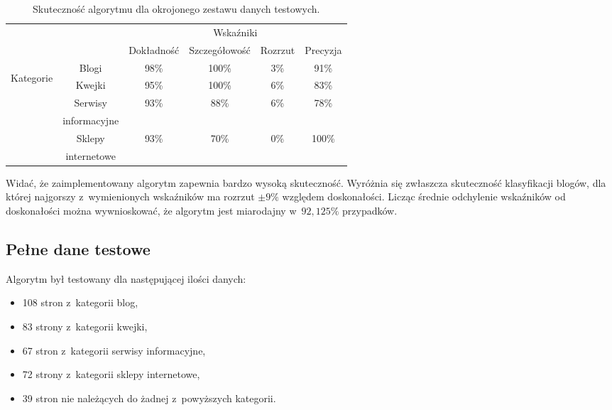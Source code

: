 \documentclass[a4paper,11pt]{article}
\begin{document}
\begin{table}[ht!]
\centering
    \begin{tabular}{| c | c | c | c | c | c |}
        \hline
        \multicolumn{2}{|c|}{} & \multicolumn{4}{c|}{Wskaźniki} \\
        \cline{3-6}
        \multicolumn{2}{|c|}{} & Dokładność & Szczegółowość & Rozrzut & Precyzja \\
        \hline
        \multirow{6}{*}{\begin{sideways}Kategorie \end{sideways}} & Blogi & 98\% & 100\% & 3\% & 91\% \\
        \cline{2-6}
        & Kwejki & 95\% & 100\% & 6\% & 83\% \\
        \cline{2-6}
        & Serwisy & \multirow{2}{*}{93\%} & \multirow{2}{*}{88\%} & \multirow{2}{*}{6\%} & \multirow{2}{*}{78\%} \\
        & informacyjne & & & & \\
        \cline{2-6}
        & Sklepy & \multirow{2}{*}{93\%} & \multirow{2}{*}{70\%} & \multirow{2}{*}{0\%} & \multirow{2}{*}{100\%} \\
        & internetowe & & & & \\
        \hline
    \end{tabular}
    \caption{Skuteczność algorytmu dla okrojonego zestawu danych testowych.}
    \label{tab:reduced_set_accuracy}
\end{table}

Widać, że zaimplementowany algorytm zapewnia bardzo wysoką skuteczność. Wyróżnia się zwłaszcza skuteczność klasyfikacji blogów, dla której najgorszy z~wymienionych wskaźników ma rozrzut $\pm 9\%$ względem doskonałości. Licząc średnie odchylenie wskaźników od doskonałości można wywnioskować, że  algorytm jest miarodajny w~$92,125\%$ przypadków.

\subsection{Pełne dane testowe}

Algorytm był testowany dla następującej ilości danych:

\begin{itemize}
    \item 108 stron z~kategorii blog,
    \item 83 strony z~kategorii kwejki,
    \item 67 stron z~kategorii serwisy informacyjne,
    \item 72 strony z~kategorii sklepy internetowe,
    \item 39 stron nie należących do żadnej z~powyższych kategorii.
\end{itemize}
\end{document}
